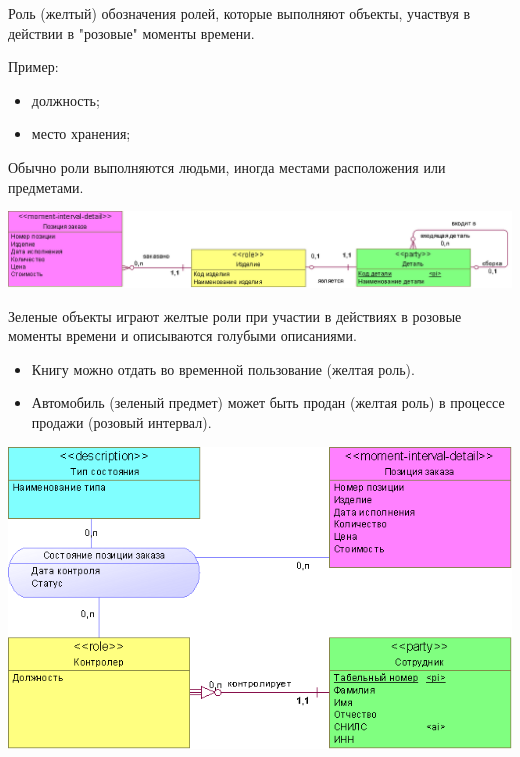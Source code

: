 \documentclass{beamer}
\begin{document}
\begin{frame}
\begin{block}{Роль (желтый)}
обозначения ролей, которые выполняют объекты, участвуя в действии в "розовые" моменты времени.
\end{block}
Пример:
\begin{itemize}
\item должность;
\item место хранения;
\end{itemize}
Обычно роли выполняются людьми, иногда  местами расположения или предметами.
\begin{center}
\includegraphics[scale=0.45]{images/lec03-pic04.png}
\end{center}
\end{frame}

\begin{frame}
Зеленые объекты играют желтые роли при участии в действиях в розовые моменты времени и описываются голубыми описаниями.
\begin{itemize}
\item Книгу можно отдать во временной пользование (желтая роль).
\item Автомобиль (зеленый предмет) может быть продан (желтая роль) в процессе продажи (розовый интервал).
\end{itemize}
\begin{center}
\includegraphics[scale=0.45]{images/lec03-pic06.png}
\end{center}
\end{frame}
\end{document}
